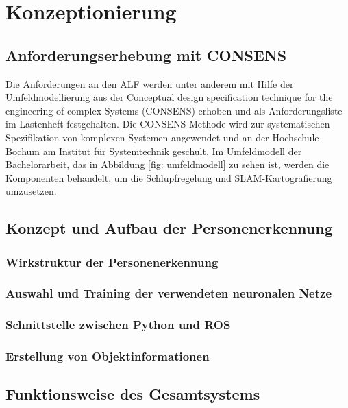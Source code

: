\chapter{Konzeptionierung}
\label{ch: Konzeptionierung}

	
	
	\section{Anforderungserhebung mit CONSENS}
	\label{sec: Anforderungserhebung}
	
			Die Anforderungen an den ALF werden unter anderem mit Hilfe der Umfeldmodellierung aus der Conceptual design specification technique for the engineering of complex Systems (CONSENS) erhoben und als Anforderungsliste im Lastenheft festgehalten. Die CONSENS Methode wird zur systematischen Spezifikation von komplexen Systemen angewendet und  an der Hochschule Bochum am Institut für Systemtechnik geschult. Im Umfeldmodell der Bachelorarbeit, das in Abbildung \ref{fig: umfeldmodell} zu sehen ist, werden die Komponenten behandelt, um die Schlupfregelung und  SLAM-Kartografierung umzusetzen.
			
	
	\section{Konzept und Aufbau der Personenerkennung}
	
		\subsection{Wirkstruktur der Personenerkennung}
		
		\subsection{Auswahl und Training der verwendeten neuronalen Netze}
		
		\subsection{Schnittstelle zwischen Python und ROS}
		
		\subsection{Erstellung von Objektinformationen}
	
	\section{Funktionsweise des Gesamtsystems}
	
	
		
		
				   		

